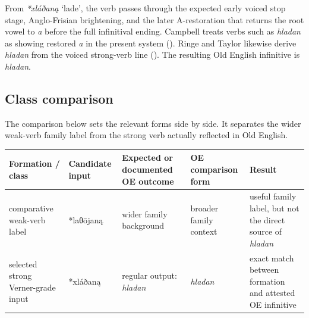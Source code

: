\documentclass[
  british,
  a4paper,
  openany]{book}
\newcounter{none} %
\providecommand{\Recon}[1]{\emph{*#1}}
{\catcode`→=\active \global\def→{\ensuremath{\rightarrow}}}
\providecommand{\Recon}[1]{\emph{*#1}}
{\catcode`→=\active \global\def→{\ensuremath{\rightarrow}}}
\begin{document}
From \Recon{xláðaną} `lade', the verb passes through the expected early
voiced stop stage, Anglo-Frisian brightening, and the later
A-restoration that returns the root vowel to \emph{a} before the full
infinitival ending. Campbell treats verbs such as \emph{hladan} as
showing restored \emph{a} in the present system
(). Ringe and
Taylor likewise derive \emph{hladan} from the voiced strong-verb line
(). The
resulting Old English infinitive is \emph{hladan}.

\subsection{Class comparison}\label{class-comparison-2}

The comparison below sets the relevant forms side by side. It separates
the wider weak-verb family label from the strong verb actually reflected
in Old English.

{\def\LTcaptype{none} %
\begin{longtable}[]{@{}
  >{\raggedright\arraybackslash}p{}
  >{\raggedright\arraybackslash}p{}
  >{\raggedright\arraybackslash}p{}
  >{\raggedright\arraybackslash}p{}
  >{\raggedright\arraybackslash}p{}@{}}
\toprule\noalign{}
\begin{minipage}[b]{\linewidth}\raggedright
Formation / class
\end{minipage} & \begin{minipage}[b]{\linewidth}\raggedright
Candidate input
\end{minipage} & \begin{minipage}[b]{\linewidth}\raggedright
Expected or documented OE outcome
\end{minipage} & \begin{minipage}[b]{\linewidth}\raggedright
OE comparison form
\end{minipage} & \begin{minipage}[b]{\linewidth}\raggedright
Result
\end{minipage} \\
\midrule\noalign{}
\endhead
\bottomrule\noalign{}
\endlastfoot
comparative weak-verb label & *laθōjaną & wider family background &
broader family context & useful family label, but not the direct source
of \emph{hladan} \\
selected strong Verner-grade input & *xláðaną & regular output:
\emph{hladan} & \emph{hladan} & exact match between formation and
attested OE infinitive \\
\end{longtable}
}
\end{document}
